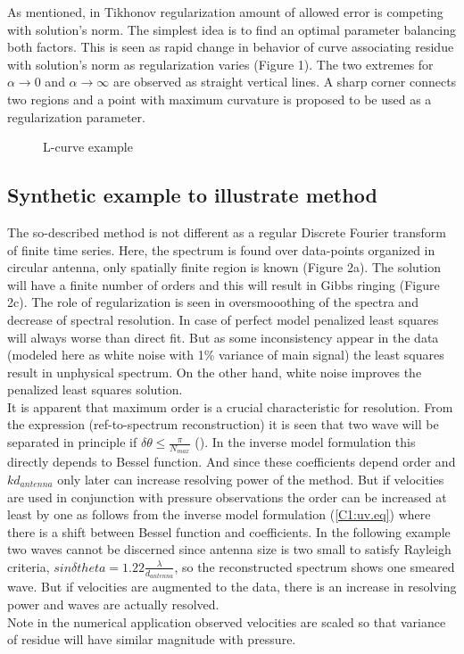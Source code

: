 As mentioned, in Tikhonov regularization amount of allowed error is competing with solution's norm. The simplest idea is to find an optimal parameter balancing both factors. This is seen as rapid change in behavior of curve associating residue with solution's norm as regularization varies (Figure 1). The two extremes for $\alpha \rightarrow 0$ and $\alpha \rightarrow \infty$ are observed as straight vertical lines. A sharp corner connects two regions and a point with maximum curvature is proposed to be used as a regularization parameter. 
\begin{figure}
\caption{L-curve example}
\end{figure}

\subsection{Synthetic example to illustrate method}
The so-described method is not different as a regular Discrete Fourier transform of finite time 
series. Here, the spectrum is found over data-points organized in circular antenna, only spatially 
finite region is known (Figure 2a). The solution will have a finite number of orders and this will 
result in Gibbs ringing (Figure 2c). The role of regularization is seen in oversmooothing of the 
spectra and decrease of spectral resolution. In case of perfect model penalized least squares will 
always worse than direct fit. But as some inconsistency appear in the data (modeled here as white 
noise with 1\% variance of main signal) the least squares result in unphysical spectrum. On the 
other hand, white noise improves the penalized least squares solution.\\
It is apparent that maximum order is a crucial characteristic for resolution. From the expression 
(ref-to-spectrum reconstruction) it is seen that two wave will be separated in principle if $ 
\delta \theta \leq \frac{\pi}{N_{max}} $ (\cite{rafaely2004plane}). In the inverse model 
formulation this directly depends to Bessel function. And since these coefficients depend order and 
$ k d_{antenna} $ only later can increase resolving power of the method. But if velocities are used 
in conjunction with pressure observations the order can be increased at least by one as follows 
from the inverse model formulation (\ref{C1:uv.eq}) where there is a shift between Bessel function 
and coefficients. In the following example two waves cannot be discerned since antenna size is two 
small to satisfy Rayleigh criteria, $ sin \delta theta = 1.22 \frac{\lambda}{d_{antenna}} $, so the 
reconstructed spectrum shows one smeared wave. But if velocities are augmented to the data, there 
is an increase in resolving power and waves are actually resolved.\\
Note in the numerical application observed velocities are scaled so that variance of 
residue will have similar magnitude with pressure. \\

